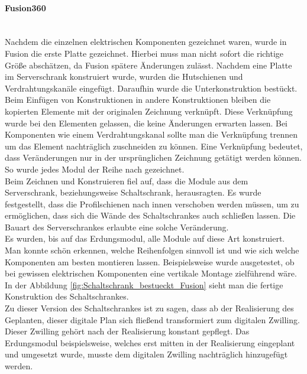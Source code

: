     \paragraph{Fusion360}\mbox{}\\
    Nachdem die einzelnen elektrischen Komponenten gezeichnet waren, wurde in Fusion die erste Platte gezeichnet. Hierbei muss man nicht sofort die richtige Größe abschätzen, da Fusion spätere Änderungen zulässt. Nachdem eine Platte im Serverschrank konstruiert wurde, wurden die Hutschienen und Verdrahtungskanäle eingefügt. Daraufhin wurde die Unterkonstruktion bestückt. Beim Einfügen von Konstruktionen in andere Konstruktionen bleiben die kopierten Elemente mit der originalen Zeichnung verknüpft. Diese Verknüpfung wurde bei den Elementen gelassen, die keine Änderungen erwarten lassen. Bei Komponenten wie einem Verdrahtungskanal sollte man die Verknüpfung trennen um das Element nachträglich zuschneiden zu können. Eine Verknüpfung bedeutet, dass Veränderungen nur in der ursprünglichen Zeichnung getätigt werden können. So wurde jedes Modul der Reihe nach gezeichnet.\\
    Beim Zeichnen und Konstruieren fiel auf, dass die Module aus dem Serverschrank, beziehungsweise Schaltschrank, herausragten. Es wurde festgestellt, dass die Profilschienen nach innen verschoben werden müssen, um zu ermöglichen, dass sich die Wände des Schaltschrankes auch schließen lassen. Die Bauart des Serverschrankes erlaubte eine solche Veränderung.\\ 
    Es wurden, bis auf das Erdungsmodul, alle Module auf diese Art konstruiert. Man konnte schön erkennen, welche Reihenfolgen sinnvoll ist und wie sich welche Komponenten am besten montieren lassen. Beispielsweise wurde ausgetestet, ob bei gewissen elektrischen Komponenten eine vertikale Montage zielführend wäre. In der Abbildung \ref{fig:Schaltschrank_bestueckt_Fusion} sieht man die fertige Konstruktion des Schaltschrankes.\\
    Zu dieser Version des Schaltschrankes ist zu sagen, dass ab der Realisierung des Geplanten, dieser digitale Plan sich fließend transformiert zum digitalen Zwilling. Dieser Zwilling gehört nach der Realisierung konstant gepflegt. Das Erdungsmodul beispielsweise, welches erst mitten in der Realisierung eingeplant und umgesetzt wurde, musste dem digitalen Zwilling nachträglich hinzugefügt werden.
